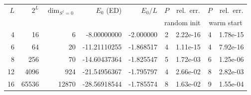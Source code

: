 \begin{tabular}{r r r r r c c c c}
\toprule
$L$ & $2^L$ & $\dim_{S^z=0}$ & $E_0$ (ED) & $E_0/L$ & $P$ & rel.\ err. & $P$ & rel.\ err. \\
& & & & & \multicolumn{2}{c}{random init} & \multicolumn{2}{c}{warm start} \\
\midrule
4 & 16 & 6 & -8.00000000 & -2.000000 & 2 & 2.22e-16 & 4 & 1.78e-15 \\
6 & 64 & 20 & -11.21110255 & -1.868517 & 4 & 1.11e-15 & 4 & 7.92e-16 \\
8 & 256 & 70 & -14.60437364 & -1.825547 & 5 & 1.72e-03 & 6 & 1.25e-06 \\
12 & 4096 & 924 & -21.54956367 & -1.795797 & 4 & 2.66e-02 & 8 & 2.82e-03 \\
16 & 65536 & 12870 & -28.56918544 & -1.785574 & 8 & 1.63e-02 & 9 & 1.55e-04 \\
\bottomrule
\end{tabular}
